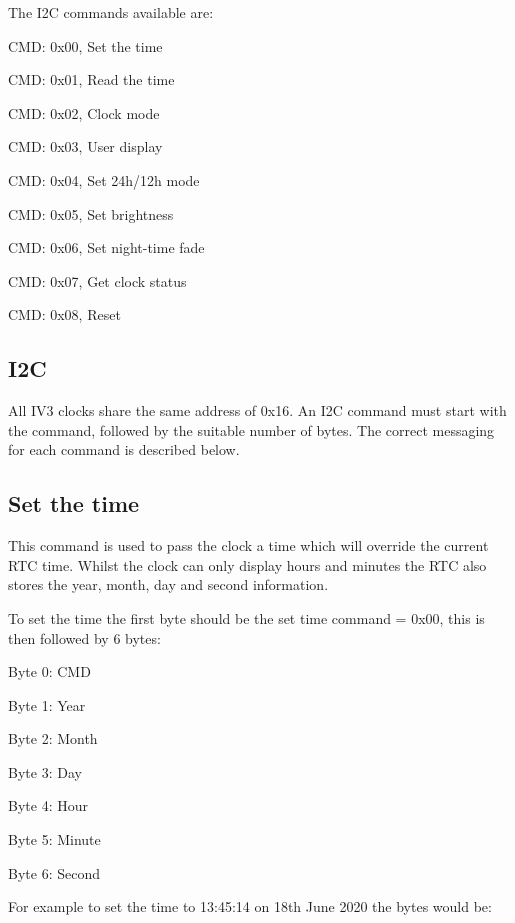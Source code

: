 \documentclass[12pt]{article}
\begin{document}
The I2C commands available are:
\begin{description}[font=$\bullet$~\normalfont\scshape]
\item [] CMD: 0x00, Set the time
\item [] CMD: 0x01, Read the time
\item [] CMD: 0x02, Clock mode
\item [] CMD: 0x03, User display
\item [] CMD: 0x04, Set 24h/12h mode
\item [] CMD: 0x05, Set brightness
\item [] CMD: 0x06, Set night-time fade
\item [] CMD: 0x07, Get clock status
\item [] CMD: 0x08, Reset
\end{description}

 

\subsection{I2C}
All IV3 clocks share the same address of 0x16. An I2C command must start with the command, followed by the suitable number of bytes. The correct messaging for each command is described below. 
\subsection{Set the time}
This command is used to pass the clock a time which will override the current RTC time. Whilst the clock can only display hours and minutes the RTC also stores the year, month, day and second information. 

To set the time the first byte should be the set time command = 0x00, this is then followed by 6 bytes:

\begin{description}[font=$\bullet$~\normalfont\scshape]
\item [] Byte 0: CMD
\item [] Byte 1: Year
\item [] Byte 2: Month
\item [] Byte 3: Day
\item [] Byte 4: Hour
\item [] Byte 5: Minute
\item [] Byte 6: Second
\end{description}

For example to set the time to 13:45:14 on 18th June 2020 the bytes would be:
\end{document}
